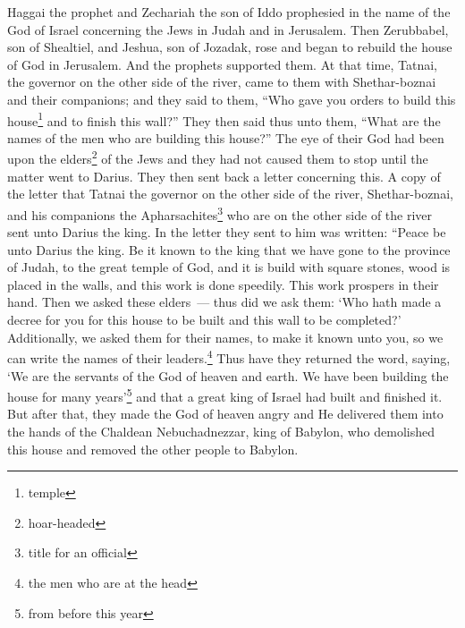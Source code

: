 
\begin{enumerate*}[mode=unboxed]
     Haggai the prophet and Zechariah the son of Iddo prophesied in the name of the God of Israel concerning the Jews in Judah and in Jerusalem.%
     Then Zerubbabel, son of Shealtiel, and Jeshua, son of Jozadak, rose and began to rebuild the house of God in Jerusalem. And the prophets supported them.%
     At that time, Tatnai, the governor on the other side of the river, came to them with Shethar-boznai and their companions; and they said to them, ``Who gave you orders to build this house\footnote{temple} and to finish this wall?''%
     They then said thus unto them, ``What are the names of the men who are building this house?''%
     The eye of their God had been upon the elders\footnote{hoar-headed} of the Jews and they had not caused them to stop until the matter went to Darius. They then sent back a letter concerning this.%
     A copy of the letter that Tatnai the governor on the other side of the river, Shethar-boznai, and his companions the Apharsachites\footnote{title for an official} who are on the other side of the river sent unto Darius the king.%
     In the letter they sent to him was written: ``Peace be unto Darius the king.%
     Be it known to the king that we have gone to the province of Judah, to the great temple of God, and it is build with square stones, wood is placed in the walls, and this work is done speedily. This work prospers in their hand.%
     Then we asked these elders~--- thus did we ask them: `Who hath made a decree for you for this house to be built and this wall to be completed?'%
     Additionally, we asked them for their names, to make it known unto you, so we can write the names of their leaders.\footnote{the men who are at the head}%
     Thus have they returned the word, saying, `We are the servants of the God of heaven and earth. We have been building the house for many years'\footnote{from before this year} and that a great king of Israel had built and finished it.%
     But after that, they made the God of heaven angry and He delivered them into the hands of the Chaldean Nebuchadnezzar, king of Babylon, who demolished this house and removed the other people to Babylon.%

\end{enumerate*}
